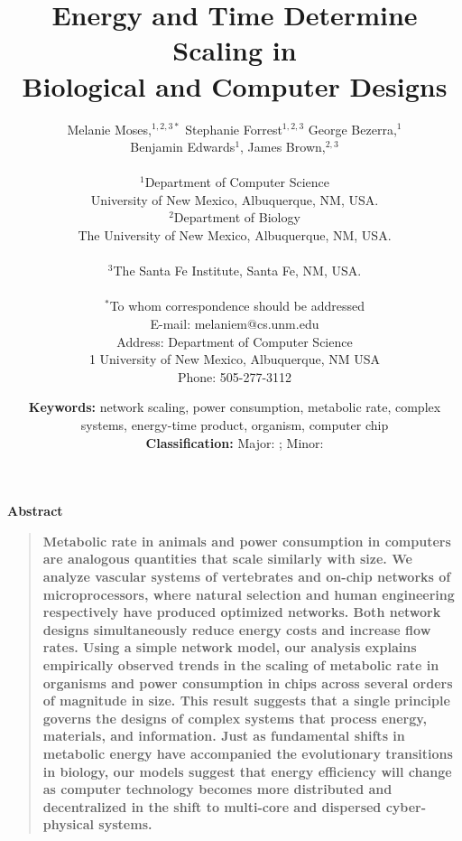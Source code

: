 \documentclass[12pt]{article}
\title{Energy and Time Determine Scaling in \\Biological and Computer Designs}
\author
{Melanie Moses,$^{1,2,3\ast}$ Stephanie Forrest$^{1,2,3}$ George Bezerra,$^{1}$ \\Benjamin Edwards$^{1}$, James Brown,$^{2,3}$ \\
\\
\normalsize{$^{1}$Department of Computer Science}\\
\normalsize{University of New Mexico, Albuquerque, NM, USA.}\\
\normalsize{$^{2}$Department of Biology}\\
\normalsize{The University of New Mexico, Albuquerque, NM, USA.}\\
\\
\normalsize{$^{3}$The Santa Fe Institute, Santa Fe, NM, USA.}\\
\\
\normalsize{$^\ast$To whom correspondence should be addressed}\\
\normalsize{E-mail: melaniem@cs.unm.edu}\\
\normalsize{Address: Department of Computer Science}\\
\normalsize{1 University of New Mexico, Albuquerque, NM USA}\\
\normalsize{Phone: 505-277-3112}\\
}
\date{\normalsize{{\bf Keywords:} network scaling, power consumption, 
metabolic rate, complex systems, energy-time product, organism, 
computer chip}\\
\normalsize{{\bf Classification:} Major: ; Minor: }}
\newenvironment{sciabstract}{%
\begin{quote} \bf}
{\end{quote}}
\begin{document}
 

\newenvironment{caseof}{\setcounter{casenum}{1}}{\vskip.5\baselineskip}
\newcommand{\case}[2]{\vskip.5\baselineskip\par\noindent {\bfseries Case
\arabic{casenum}:} #1: #2\addtocounter{casenum}{1}}


\baselineskip24pt


\maketitle 


\newpage


\centerline{\Large{\bf Abstract}}
\begin{sciabstract}
  Metabolic rate in animals and power consumption in computers are
  analogous quantities that scale similarly with size.  We analyze
  vascular systems of vertebrates and on-chip networks of
  microprocessors, where natural selection and human engineering
  respectively have produced optimized networks.  
Both network designs
  simultaneously reduce energy costs and increase flow rates.  Using a
  simple network model, our analysis explains empirically observed
  trends in the scaling of metabolic rate in organisms and power
  consumption in chips across several orders of magnitude in size.
  This result suggests that a single principle governs the designs of
  complex systems that process energy, materials, and
  information. Just as fundamental shifts in metabolic energy have accompanied the evolutionary transitions in biology, our models suggest that energy efficiency will change as computer technology becomes more distributed and decentralized in the shift to multi-core and dispersed cyber-physical systems. 
  
  
\end{sciabstract}
\end{document}
